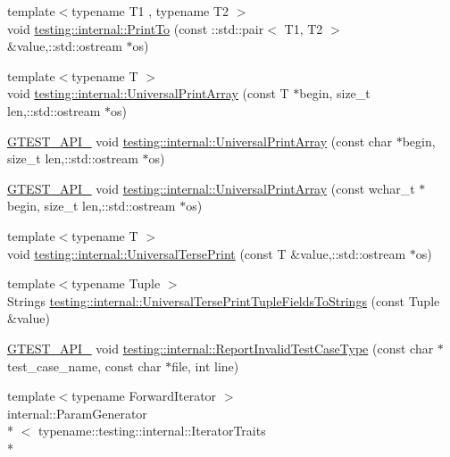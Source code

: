 \begin{DoxyCompactItemize}
\item 
{\footnotesize template$<$typename T1 , typename T2 $>$ }\\void \hyperlink{namespacetesting_1_1internal_a5759c5abed8ebab0e1a8a0f8aadab768}{testing\-::internal\-::\-Print\-To} (const \-::std\-::pair$<$ T1, T2 $>$ \&value,\-::std\-::ostream $\ast$os)
\item 
{\footnotesize template$<$typename T $>$ }\\void \hyperlink{namespacetesting_1_1internal_a73b5046a2ed65d0e2fb7cdc9bdaee3fe}{testing\-::internal\-::\-Universal\-Print\-Array} (const T $\ast$begin, size\-\_\-t len,\-::std\-::ostream $\ast$os)
\item 
\hyperlink{gtest-port_8h_aa73be6f0ba4a7456180a94904ce17790}{G\-T\-E\-S\-T\-\_\-\-A\-P\-I\-\_\-} void \hyperlink{namespacetesting_1_1internal_a3fac293aeb6e7e6b3ff3e27404f6588b}{testing\-::internal\-::\-Universal\-Print\-Array} (const char $\ast$begin, size\-\_\-t len,\-::std\-::ostream $\ast$os)
\item 
\hyperlink{gtest-port_8h_aa73be6f0ba4a7456180a94904ce17790}{G\-T\-E\-S\-T\-\_\-\-A\-P\-I\-\_\-} void \hyperlink{namespacetesting_1_1internal_ae95ea0aea80977c0870df98b27a17cac}{testing\-::internal\-::\-Universal\-Print\-Array} (const wchar\-\_\-t $\ast$begin, size\-\_\-t len,\-::std\-::ostream $\ast$os)
\item 
{\footnotesize template$<$typename T $>$ }\\void \hyperlink{namespacetesting_1_1internal_ab3d834fb6c31d29e36400cc19905294b}{testing\-::internal\-::\-Universal\-Terse\-Print} (const T \&value,\-::std\-::ostream $\ast$os)
\item 
{\footnotesize template$<$typename Tuple $>$ }\\Strings \hyperlink{namespacetesting_1_1internal_a7e60d1478b074801c766eeee9be6c772}{testing\-::internal\-::\-Universal\-Terse\-Print\-Tuple\-Fields\-To\-Strings} (const Tuple \&value)
\item 
\hyperlink{gtest-port_8h_aa73be6f0ba4a7456180a94904ce17790}{G\-T\-E\-S\-T\-\_\-\-A\-P\-I\-\_\-} void \hyperlink{namespacetesting_1_1internal_a864171ad4983f5b8e4258d0d5db0c03b}{testing\-::internal\-::\-Report\-Invalid\-Test\-Case\-Type} (const char $\ast$test\-\_\-case\-\_\-name, const char $\ast$file, int line)
\item 
{\footnotesize template$<$typename Forward\-Iterator $>$ }\\internal\-::\-Param\-Generator\\*
$<$ typename\-::testing\-::internal\-::\-Iterator\-Traits\\*

\end{DoxyCompactItemize}
